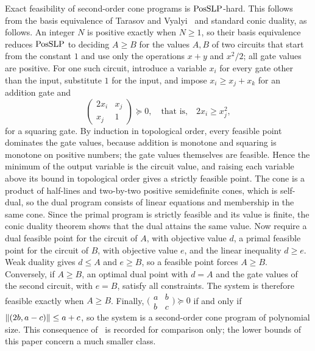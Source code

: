 \begin{remark}
\label{rem:models-socp}
Exact feasibility of second-order cone programs is $\mathrm{PosSLP}$-hard. This
follows from the basis equivalence of Tarasov and
Vyalyi~\cite[Theorem~3]{TarasovVyalyi2008} and standard conic duality, as
follows. An integer $N$ is positive exactly when $N\ge1$, so their basis
equivalence reduces $\mathrm{PosSLP}$ to deciding $A\ge B$ for the values $A,B$ of two
circuits that start from the constant $1$ and use only the operations $x+y$
and $x^2/2$; all gate values are positive. For one such
circuit, introduce a variable $x_i$ for every gate other than the input,
substitute $1$ for the input, and impose $x_i\ge x_j+x_k$ for an addition
gate and
\[
\begin{pmatrix}2x_i&x_j\\x_j&1\end{pmatrix}\succeq0,
\quad\text{that is,}\quad 2x_i\ge x_j^2,
\]
for a squaring gate. By induction in topological order, every feasible point
dominates the gate values, because addition is monotone and squaring is
monotone on positive numbers; the gate values themselves are feasible. Hence
the minimum of the output variable is the circuit value, and raising each
variable above its bound in topological order gives a strictly feasible
point. The cone is a product of half-lines and two-by-two positive
semidefinite cones, which is self-dual, so the dual program consists of
linear equations and membership in the same cone. Since the primal program
is strictly feasible and its value is finite, the conic duality theorem shows
that the dual attains the same value. Now require a dual feasible point for
the circuit of $A$, with objective value $d$, a primal feasible point for the
circuit of $B$, with objective value $e$, and the linear inequality $d\ge e$.
Weak duality gives $d\le A$ and $e\ge B$, so a feasible point forces $A\ge B$.
Conversely, if $A\ge B$, an optimal dual point with $d=A$ and the gate values
of the second circuit, with $e=B$, satisfy all constraints. The system is
therefore feasible exactly when $A\ge B$. Finally,
$\bigl(\begin{smallmatrix}a&b\\b&c\end{smallmatrix}\bigr)\succeq0$ if and only
if $\left\lVert(2b,a-c)\right\rVert\le a+c$, so the system is a second-order cone program of
polynomial size. This consequence of~\cite{TarasovVyalyi2008} is recorded
for comparison only; the lower bounds of this paper concern a much smaller
class.
\end{remark}

